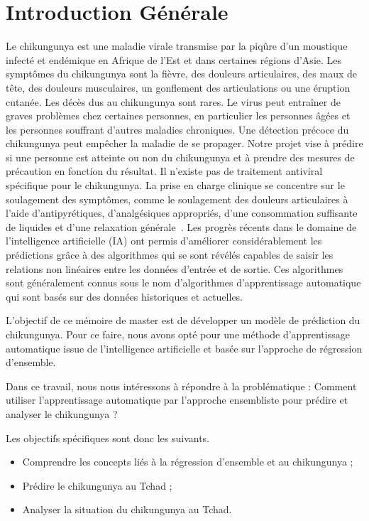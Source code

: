 \chapter*{Introduction Générale}

Le chikungunya est une maladie virale transmise par la piqûre d'un moustique infecté et endémique en Afrique de l'Est et dans certaines régions d'Asie. Les symptômes du chikungunya sont la fièvre, des douleurs articulaires, des maux de tête, des douleurs musculaires, un gonflement des articulations ou une éruption cutanée. Les décès dus au chikungunya sont rares. Le virus peut entraîner de graves problèmes chez certaines personnes, en particulier les personnes âgées et les personnes souffrant d'autres maladies chroniques. Une détection précoce du chikungunya peut empêcher la maladie de se propager. Notre projet vise à prédire si une personne est atteinte ou non du chikungunya et à prendre des mesures de précaution en fonction du résultat. Il n'existe pas de traitement antiviral spécifique pour le chikungunya. La prise en charge clinique se concentre sur le soulagement des symptômes, comme le soulagement des douleurs articulaires à l'aide d'antipyrétiques, d'analgésiques appropriés, d'une consommation suffisante de liquides et d'une relaxation générale~\cite{9985708}.
Les progrès récents dans le domaine de l'intelligence artificielle (IA) ont permis d'améliorer considérablement les prédictions grâce à des algorithmes qui se sont révélés capables de saisir les relations non linéaires entre les données d'entrée et de sortie. Ces algorithmes sont généralement connus sous le nom d'algorithmes d'apprentissage automatique qui sont basés sur des données historiques et actuelles.

L'objectif de ce mémoire de master est de développer un modèle de prédiction du chikungunya. Pour ce faire, nous avons opté pour une méthode d'apprentissage automatique issue de l'intelligence artificielle et basée sur l'approche de régression d'ensemble.

Dans ce travail, nous nous intéressons à répondre à la problématique : Comment utiliser l'apprentissage automatique par l'approche ensembliste pour prédire et analyser le chikungunya ?

Les objectifs spécifiques sont donc les suivants.
\begin{itemize}
	
	\item Comprendre les concepts liés à la régression d'ensemble et au chikungunya ;
	\item Prédire le chikungunya au Tchad ;	
	\item Analyser la situation du chikungunya au Tchad.
\end{itemize}
	
